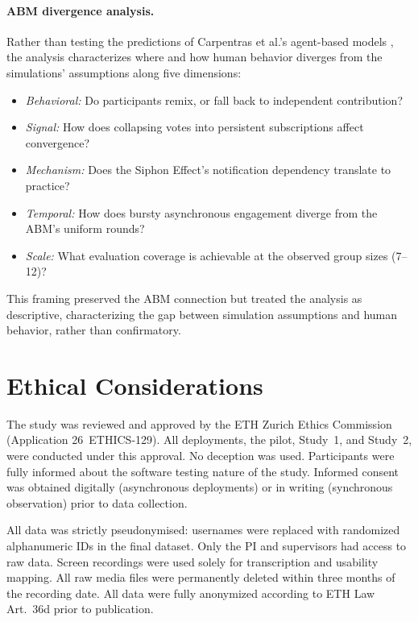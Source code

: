 \documentclass[a4paper, 12pt, twoside]{iviathesis}
\begin{document}
\paragraph{ABM divergence analysis.}
Rather than testing the predictions of Carpentras et al.'s agent-based models \cite{carpentras_empowering_2024, carpentras_wisdom_2025}, the analysis characterizes where and how human behavior diverges from the simulations' assumptions along five dimensions:
\begin{itemize}
    \item \textit{Behavioral:} Do participants remix, or fall back to independent contribution?
    \item \textit{Signal:} How does collapsing votes into persistent subscriptions affect convergence?
    \item \textit{Mechanism:} Does the Siphon Effect's notification dependency translate to practice?
    \item \textit{Temporal:} How does bursty asynchronous engagement diverge from the ABM's uniform rounds?
    \item \textit{Scale:} What evaluation coverage is achievable at the observed group sizes (7--12)?
\end{itemize}
This framing preserved the ABM connection but treated the analysis as descriptive, characterizing the gap between simulation assumptions and human behavior, rather than confirmatory.


\section{Ethical Considerations}
The study was reviewed and approved by the ETH Zurich Ethics Commission (Application 26~ETHICS-129). All deployments, the pilot, Study~1, and Study~2, were conducted under this approval. No deception was used. Participants were fully informed about the software testing nature of the study. Informed consent was obtained digitally (asynchronous deployments) or in writing (synchronous observation) prior to data collection.

All data was strictly pseudonymised: usernames were replaced with randomized alphanumeric IDs in the final dataset. Only the PI and supervisors had access to raw data. Screen recordings were used solely for transcription and usability mapping. All raw media files were permanently deleted within three months of the recording date. All data were fully anonymized according to ETH Law Art.~36d prior to publication.
\end{document}
